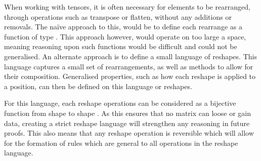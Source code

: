 When working with tensors, it is often necessary for elements to be rearranged, 
through operations such as transpose or flatten, without any additions or removals.
The naïve approach to this, would be to define each rearrange as a function of type .
This approach however, would operate on too large a space, meaning reasoning upon
such functions would be difficult and could not be generalised.
An alternate approach is to define a small language of reshapes.
This language captures a small set of rearrangements, as well as methods to allow
for their composition.
Generalised properties, such as how each reshape is applied to a position, can 
then be defined on this language or reshapes.

For this language, each reshape operations can be considered as a bijective function
from shape  to shape . 
As this ensures that no matrix can loose or gain data, creating a strict reshape 
language will strengthen any reasoning in future proofs.
This also means that any reshape operation is reversible which will allow for the
formation of rules which are general to all operations in the reshape language.


